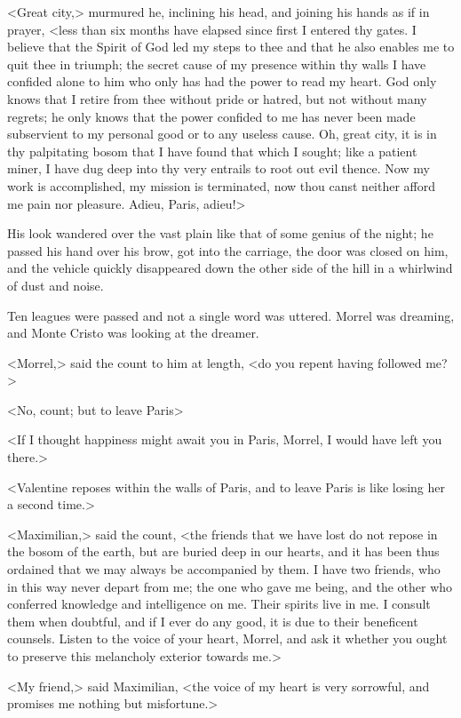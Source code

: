  <Great city,> murmured he, inclining his head, and joining his hands as if in prayer, <less than six months have elapsed since first I entered thy gates. I believe that the Spirit of God led my steps to thee and that he also enables me to quit thee in triumph; the secret cause of my presence within thy walls I have confided alone to him who only has had the power to read my heart. God only knows that I retire from thee without pride or hatred, but not without many regrets; he only knows that the power confided to me has never been made subservient to my personal good or to any useless cause. Oh, great city, it is in thy palpitating bosom that I have found that which I sought; like a patient miner, I have dug deep into thy very entrails to root out evil thence. Now my work is accomplished, my mission is terminated, now thou canst neither afford me pain nor pleasure. Adieu, Paris, adieu!> 

 His look wandered over the vast plain like that of some genius of the night; he passed his hand over his brow, got into the carriage, the door was closed on him, and the vehicle quickly disappeared down the other side of the hill in a whirlwind of dust and noise. 

 Ten leagues were passed and not a single word was uttered. Morrel was dreaming, and Monte Cristo was looking at the dreamer. 

 <Morrel,> said the count to him at length, <do you repent having followed me?> 

 <No, count; but to leave Paris\longdash> 

 <If I thought happiness might await you in Paris, Morrel, I would have left you there.> 

 <Valentine reposes within the walls of Paris, and to leave Paris is like losing her a second time.> 

 <Maximilian,> said the count, <the friends that we have lost do not repose in the bosom of the earth, but are buried deep in our hearts, and it has been thus ordained that we may always be accompanied by them. I have two friends, who in this way never depart from me; the one who gave me being, and the other who conferred knowledge and intelligence on me. Their spirits live in me. I consult them when doubtful, and if I ever do any good, it is due to their beneficent counsels. Listen to the voice of your heart, Morrel, and ask it whether you ought to preserve this melancholy exterior towards me.> 

 <My friend,> said Maximilian, <the voice of my heart is very sorrowful, and promises me nothing but misfortune.> 

